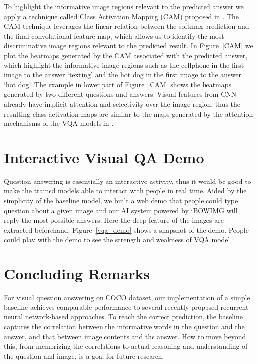 \documentclass{article} %
\begin{document}
To highlight the informative image regions relevant to the predicted answer we apply a technique called Class Activation Mapping (CAM) proposed in \cite{zhou2015localizable}. The CAM technique leverages the linear relation between the softmax prediction and the final convolutional feature map, which allows us to identify the most discriminative image regions relevant to the predicted result. In Figure~\ref{CAM} we plot the heatmaps generated by the CAM associated with the predicted answer, which highlight the informative image regions such as the cellphone in the first image to the answer `texting' and the hot dog in the first image to the answer `hot dog'. The example in lower part of Figure~\ref{CAM} shows the heatmaps generated by two different questions and answers. Visual features from CNN already have implicit attention and selectivity over the image region, thus the resulting class activation maps are similar to the maps generated by the attention mechanisms of the VQA models in \cite{shih2015look,xu2015ask,yang2015stacked}. 

\section{Interactive Visual QA Demo} 

Question answering is essentially an interactive activity, thus it would be good to make the trained models able to interact with people in real time. Aided by the simplicity of the baseline model, we built a web demo that people could type question about a given image and our AI system powered by iBOWIMG will reply the most possible answers. Here the deep feature of the images are extracted beforehand. Figure~\ref{vqa_demo} shows a snapshot of the demo. People could play with the demo to see the strength and weakness of VQA model.


\section{Concluding Remarks}


For visual question answering on COCO dataset, our implementation of a simple baseline achieves comparable performance to several recently proposed recurrent neural network-based approaches. To reach the correct prediction, the baseline captures the correlation between the informative words in the question and the answer, and that between image contents and the answer. How to move beyond this, from memorizing the correlations to actual reasoning and understanding of the question and image, is a goal for future research.
\end{document}
